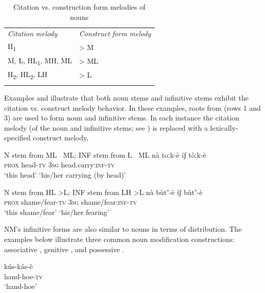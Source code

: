 \documentclass[output=paper]{langsci/langscibook}
\begin{document}
\begin{table}
\caption{Citation vs. construction form melodies of nouns}
\label{tab:4}

\begin{tabularx}{\textwidth}{XX}
\lsptoprule

\itshape Citation melody & \itshape Construct form melody\\
H\textsubscript{1} & {\textgreater} M\\
M, L, HL\textsubscript{1}, MH, ML & {\textgreater} ML\\
H\textsubscript{2}, HL\textsubscript{2}, LH & {\textgreater} L\\
\lspbottomrule
\end{tabularx}
\end{table}

Examples  and  illustrate that both noun stems and infinitive stems exhibit the citation vs. construct melody behavior. In these examples, roots from  (rows 1 and 3) are used to form noun and infinitive stems. In each instance the citation melody (of the noun and infinitive stems; see ) is replaced with a lexically-specified construct melody.  


\ea\label{ex:mahland:24}
N stem from ML $\>$ ML; INF stem from L $\>$ ML
\gll n\`{a}      toːk-\`{e}    \'{i}ʃ      t\`{o}ːk-\`{e}\\
\textsc{prox   }head\textsc{{}-tv}  \textsc{3sg}    head.carry\textsc{:inf-tv}\\
\glt `this head'    `his/her carrying (by head)'
\z

\ea\label{ex:mahland:25}
N stem from HL \textgreater L; INF stem from LH \textgreater L
\gll n\`{a}       b\`{u}tʼ-\`{e}      \'{i}ʃ        b\`{u}tʼ-\`{e}\\
\textsc{prox   }shame/fear\textsc{{}-tv}   \textsc{3sg}     shame/fear:\textsc{inf-tv} \\
\glt `this shame/fear'    `his/her fearing'
\z

NM's infinitive forms are also similar to nouns in terms of distribution. The examples below illustrate three common noun modification constructions: associative , genitive , and possessive .

\ea\label{ex:mahland:26}
\gll k\'{u}s-k\'{a}s-\`{e}  \\
hand-hoe\textsc{{}-tv}\\
\glt `hand-hoe'
\z
\end{document}

